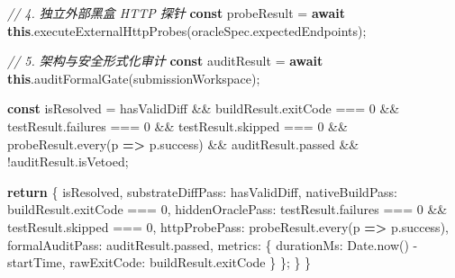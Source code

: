 \documentclass[
]{ctexart}
\newenvironment{Shaded}{}{}
\newcommand{\AttributeTok}[1]{\textcolor[rgb]{0.49,0.56,0.16}{#1}}
\newcommand{\BuiltInTok}[1]{\textcolor[rgb]{0.00,0.50,0.00}{#1}}
\newcommand{\CommentTok}[1]{\textcolor[rgb]{0.38,0.63,0.69}{\textit{#1}}}
\newcommand{\ControlFlowTok}[1]{\textcolor[rgb]{0.00,0.44,0.13}{\textbf{#1}}}
\newcommand{\DecValTok}[1]{\textcolor[rgb]{0.25,0.63,0.44}{#1}}
\newcommand{\FunctionTok}[1]{\textcolor[rgb]{0.02,0.16,0.49}{#1}}
\newcommand{\KeywordTok}[1]{\textcolor[rgb]{0.00,0.44,0.13}{\textbf{#1}}}
\newcommand{\NormalTok}[1]{#1}
\newcommand{\OperatorTok}[1]{\textcolor[rgb]{0.40,0.40,0.40}{#1}}
\renewcommand{\_}{\discretionary{}{}{\textunderscore}}
\begin{document}
\begin{Shaded}
\begin{Highlighting}[]
    \CommentTok{// 4. 独立外部黑盒 HTTP 探针}
    \KeywordTok{const}\NormalTok{ probeResult }\OperatorTok{=} \ControlFlowTok{await} \KeywordTok{this}\OperatorTok{.}\FunctionTok{executeExternalHttpProbes}\NormalTok{(oracleSpec}\OperatorTok{.}\AttributeTok{expectedEndpoints}\NormalTok{)}\OperatorTok{;}

    \CommentTok{// 5. 架构与安全形式化审计}
    \KeywordTok{const}\NormalTok{ auditResult }\OperatorTok{=} \ControlFlowTok{await} \KeywordTok{this}\OperatorTok{.}\FunctionTok{auditFormalGate}\NormalTok{(submissionWorkspace)}\OperatorTok{;}

    \KeywordTok{const}\NormalTok{ isResolved }\OperatorTok{=}\NormalTok{ hasValidDiff }\OperatorTok{\&\&}
\NormalTok{      buildResult}\OperatorTok{.}\AttributeTok{exitCode} \OperatorTok{===} \DecValTok{0} \OperatorTok{\&\&}
\NormalTok{      testResult}\OperatorTok{.}\AttributeTok{failures} \OperatorTok{===} \DecValTok{0} \OperatorTok{\&\&}\NormalTok{ testResult}\OperatorTok{.}\AttributeTok{skipped} \OperatorTok{===} \DecValTok{0} \OperatorTok{\&\&}
\NormalTok{      probeResult}\OperatorTok{.}\FunctionTok{every}\NormalTok{(p }\KeywordTok{=\textgreater{}}\NormalTok{ p}\OperatorTok{.}\AttributeTok{success}\NormalTok{) }\OperatorTok{\&\&}
\NormalTok{      auditResult}\OperatorTok{.}\AttributeTok{passed} \OperatorTok{\&\&} \OperatorTok{!}\NormalTok{auditResult}\OperatorTok{.}\AttributeTok{isVetoed}\OperatorTok{;}

    \ControlFlowTok{return}\NormalTok{ \{}
\NormalTok{      isResolved}\OperatorTok{,}
\NormalTok{      substrateDiffPass}\OperatorTok{:}\NormalTok{ hasValidDiff}\OperatorTok{,}
\NormalTok{      nativeBuildPass}\OperatorTok{:}\NormalTok{ buildResult}\OperatorTok{.}\AttributeTok{exitCode} \OperatorTok{===} \DecValTok{0}\OperatorTok{,}
\NormalTok{      hiddenOraclePass}\OperatorTok{:}\NormalTok{ testResult}\OperatorTok{.}\AttributeTok{failures} \OperatorTok{===} \DecValTok{0} \OperatorTok{\&\&}\NormalTok{ testResult}\OperatorTok{.}\AttributeTok{skipped} \OperatorTok{===} \DecValTok{0}\OperatorTok{,}
\NormalTok{      httpProbePass}\OperatorTok{:}\NormalTok{ probeResult}\OperatorTok{.}\FunctionTok{every}\NormalTok{(p }\KeywordTok{=\textgreater{}}\NormalTok{ p}\OperatorTok{.}\AttributeTok{success}\NormalTok{)}\OperatorTok{,}
\NormalTok{      formalAuditPass}\OperatorTok{:}\NormalTok{ auditResult}\OperatorTok{.}\AttributeTok{passed}\OperatorTok{,}
\NormalTok{      metrics}\OperatorTok{:}\NormalTok{ \{ durationMs}\OperatorTok{:} \BuiltInTok{Date}\OperatorTok{.}\FunctionTok{now}\NormalTok{() }\OperatorTok{{-}}\NormalTok{ startTime}\OperatorTok{,}\NormalTok{ rawExitCode}\OperatorTok{:}\NormalTok{ buildResult}\OperatorTok{.}\AttributeTok{exitCode}\NormalTok{ \}}
\NormalTok{    \}}\OperatorTok{;}
\NormalTok{  \}}
\NormalTok{\}}
\end{Highlighting}
\end{Shaded}
\end{document}
